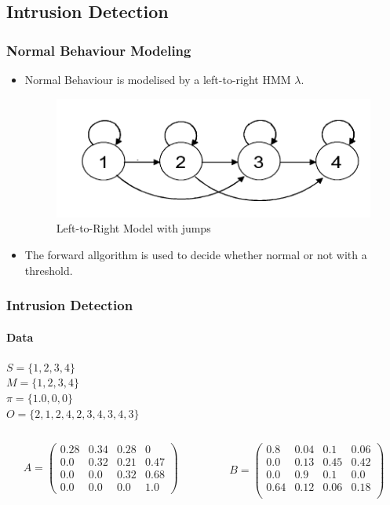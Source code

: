 \documentclass{beamer}
\begin{document}
\subsection{Intrusion Detection}
\begin{frame}
  \frametitle{Normal Behaviour Modeling}
  \begin{itemize}
  \item Normal Behaviour is modelised by a left-to-right HMM $\lambda$.
    \begin{figure}
      \includegraphics[scale=0.4]{img/left_to_right.png} 
      \caption{Left-to-Right Model with jumps}
    \end{figure}
  \item The forward allgorithm is used to decide whether normal or not
    with a threshold.
  \end{itemize}
\end{frame}
\begin{frame}
  \frametitle{Intrusion Detection}
  \framesubtitle{Data}
  $S = \{1,2,3,4\}$\\
  $M = \{1,2,3,4\}$\\
  $\pi = \{1.0,0,0\}$\\
  $O = \{2,1,2,4,2,3,4,3,4,3\}$
  \begin{columns}[T]
    \begin{column}{.45\textwidth}
      $$
      A = \begin{pmatrix}
        0.28 & 0.34 & 0.28 & 0\\
        0.0 & 0.32 & 0.21 & 0.47\\
        0.0 & 0.0 & 0.32 & 0.68\\
        0.0 & 0.0 & 0.0 & 1.0
      \end{pmatrix}
      $$
    \end{column}
    \begin{column}{.45\textwidth}
      $$
      B = \begin{pmatrix}
        0.8 & 0.04 & 0.1 & 0.06\\
        0.0 & 0.13 & 0.45 & 0.42\\
        0.0 & 0.9 & 0.1 & 0.0\\
        0.64 & 0.12 & 0.06 & 0.18\\
      \end{pmatrix}
      $$
    \end{column}
  \end{columns}
\end{frame}
\end{document}

